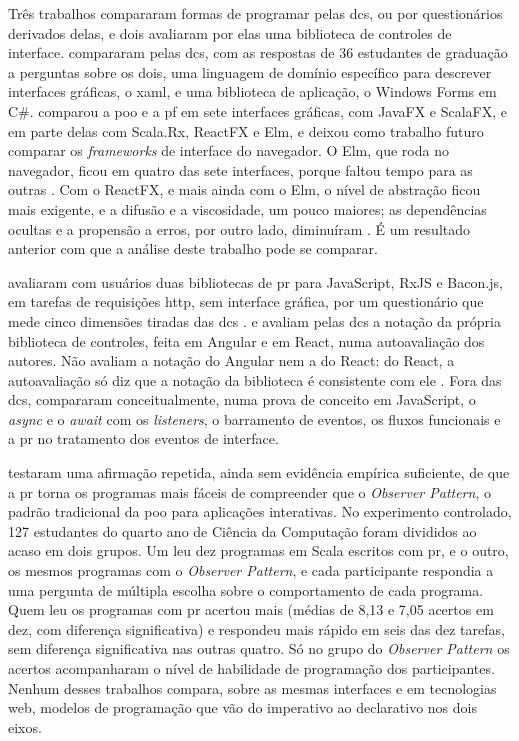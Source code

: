 Três trabalhos compararam formas de programar pelas \glspl{dc}, ou por
questionários derivados delas, e dois avaliaram por elas uma biblioteca
de controles de interface.
\textcite{mernik2009} compararam pelas \glspl{dc}, com as respostas de 36
estudantes de graduação a perguntas sobre os dois, uma linguagem de
domínio específico para descrever interfaces gráficas, o \gls{xaml}, e
uma biblioteca de aplicação, o Windows Forms em C\#.
\textcite[p. v, 11 e 104]{kiss2014} comparou a \gls{poo} e a
\gls{pf} em sete interfaces gráficas, com JavaFX e ScalaFX, e em parte
delas com Scala.Rx, ReactFX e Elm, e deixou como trabalho futuro
comparar os \emph{frameworks} de interface do navegador.
O Elm, que roda no navegador, ficou em quatro das sete interfaces, porque
faltou tempo para as outras \cite[p. 96]{kiss2014}.
Com o ReactFX, e mais ainda com o Elm, o nível de abstração ficou mais
exigente, e a difusão e a viscosidade, um pouco maiores; as dependências
ocultas e a propensão a erros, por outro lado, diminuíram
\cite[p. 97]{kiss2014}.
É um resultado anterior com que a análise deste trabalho pode se
comparar.

\textcite[p. 1510 e 1513]{zimmerle2025} avaliaram com usuários duas
bibliotecas de \gls{pr} para JavaScript, RxJS e Bacon.js, em tarefas de
requisições \gls{http}, sem interface gráfica, por um questionário
que mede cinco dimensões tiradas das \glspl{dc}
\cite[p. 1507]{zimmerle2025}.
\textcite{narechania2025} e \textcite{verma2026} avaliam pelas
\glspl{dc} a notação da própria biblioteca de controles, feita em
Angular e em React, numa autoavaliação dos autores.
Não avaliam a notação do Angular nem a do React: do React, a
autoavaliação só diz que a notação da biblioteca é consistente com ele
\cite{verma2026}.
Fora das \glspl{dc}, \textcite[p. 15]{grolaux2026} compararam
conceitualmente, numa prova de conceito em JavaScript, o \emph{async} e o
\emph{await} com os \emph{listeners}, o barramento de eventos, os fluxos
funcionais e a \gls{pr} no tratamento dos eventos de interface.

\textcite[p. 1125-1134]{salvaneschi2017} testaram uma afirmação repetida,
ainda sem evidência empírica suficiente, de que a \gls{pr} torna os
programas mais fáceis de compreender que o \emph{Observer Pattern}, o padrão
tradicional da \gls{poo} para aplicações interativas.
No experimento controlado, 127 estudantes do quarto ano de Ciência da
Computação foram divididos ao acaso em dois grupos.
Um leu dez programas em Scala escritos com \gls{pr}, e o outro, os
mesmos programas com o \emph{Observer Pattern}, e cada participante respondia
a uma pergunta de múltipla escolha sobre o comportamento de cada
programa.
Quem leu os programas com \gls{pr} acertou mais (médias de 8,13 e 7,05
acertos em dez, com diferença significativa) e respondeu mais rápido em
seis das dez tarefas, sem diferença significativa nas outras quatro.
Só no grupo do \emph{Observer Pattern} os acertos acompanharam o nível de
habilidade de programação dos participantes.
Nenhum desses trabalhos compara, sobre as mesmas interfaces e em
tecnologias web, modelos de programação que vão do imperativo ao
declarativo nos dois eixos.
